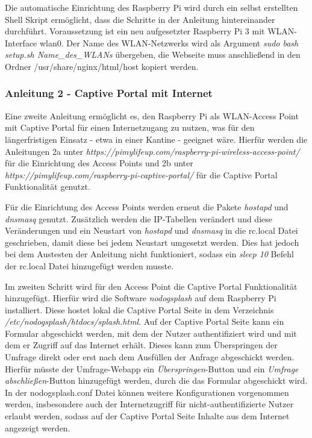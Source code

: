 Die automatische Einrichtung des Raspberry Pi wird durch ein selbst erstellten Shell Skript ermöglicht, dass die Schritte in der Anleitung hintereinander durchführt. Voraussetzung ist ein neu aufgesetzter Raspberry Pi 3 mit WLAN-Interface wlan0. Der Name des WLAN-Netzwerks wird als Argument \textit{sudo bash setup.sh Name\_des\_WLANs} übergeben, die Webseite muss anschließend in den Ordner /usr/share/nginx/html/host kopiert werden.

\subsubsection*{Anleitung 2 - Captive Portal mit Internet}
Eine zweite Anleitung ermöglicht es, den Raspberry Pi als WLAN-Access Point mit Captive Portal für einen Internetzugang zu nutzen, was für den längerfristigen Einsatz - etwa in einer Kantine - geeignet wäre. Hierfür werden die Anleitungen 2a unter \textit{https://pimylifeup.com/raspberry-pi-wireless-access-point/} für die Einrichtung des Access Points und 2b unter \textit{https://pimylifeup.com/raspberry-pi-captive-portal/} für die Captive Portal Funktionalität genutzt.

Für die Einrichtung des Access Points werden erneut die Pakete \textit{hostapd} und \textit{dnsmasq} genutzt. Zusätzlich werden die IP-Tabellen verändert und diese Veränderungen und ein Neustart von \textit{hostapd} und \textit{dnsmasq} in die rc.local Datei geschrieben, damit diese bei jedem Neustart umgesetzt werden. Dies hat jedoch bei dem Austesten der Anleitung nicht funktioniert, sodass ein \textit{sleep 10} Befehl der rc.local Datei hinzugefügt werden musste.

Im zweiten Schritt wird für den Access Point die Captive Portal Funktionalität hinzugefügt. Hierfür wird die Software \textit{nodogsplash} auf dem Raspberry Pi installiert. Diese hostet lokal die Captive Portal Seite in dem Verzeichnis \textit{/etc/nodogsplash/htdocs/splash.html}. Auf der Captive Portal Seite kann ein Formular abgeschickt werden, mit dem der Nutzer authentifiziert wird und mit dem er Zugriff auf das Internet erhält. Dieses kann zum Überspringen der Umfrage direkt oder erst nach dem Ausfüllen der Anfrage abgeschickt werden. Hierfür müsste der Umfrage-Webapp ein \textit{Überspringen}-Button und ein \textit{Umfrage abschließen}-Button hinzugefügt werden, durch die das Formular abgeschickt wird. In der nodogsplash.conf Datei können weitere Konfigurationen vorgenommen werden, insbesondere auch der Internetzugriff für nicht-authentifizierte Nutzer erlaubt werden, sodass auf der Captive Portal Seite Inhalte aus dem Internet angezeigt werden.

